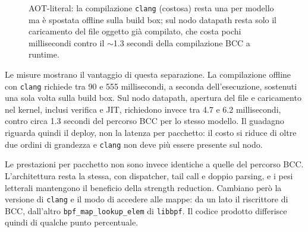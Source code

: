 \documentclass[binding=0.6cm,italian,oneside,noexaminfo]{sapthesis}
\begin{document}
\begin{figure}[h]
\centering
{}
\caption{AOT-literal: la compilazione \texttt{clang} (costosa) resta una per modello ma è spostata offline sulla build box; sul nodo datapath resta solo il caricamento del file oggetto già compilato, che costa pochi millisecondi contro il $\sim$1.3 secondi della compilazione BCC a runtime.}
\label{fig:aot}
\end{figure}

Le misure mostrano il vantaggio di questa separazione. La compilazione offline con \texttt{clang} richiede tra 90 e 555 millisecondi, a seconda dell'esecuzione, sostenuti una sola volta sulla build box. Sul nodo datapath, apertura del file e caricamento nel kernel, inclusi verifica e JIT, richiedono invece tra 4.7 e 6.2 millisecondi, contro circa 1.3 secondi del percorso BCC per lo stesso modello. Il guadagno riguarda quindi il deploy, non la latenza per pacchetto: il costo si riduce di oltre due ordini di grandezza e \texttt{clang} non deve più essere presente sul nodo.

Le prestazioni per pacchetto non sono invece identiche a quelle del percorso BCC. L'architettura resta la stessa, con dispatcher, tail call e doppio parsing, e i pesi letterali mantengono il beneficio della strength reduction. Cambiano però la versione di \texttt{clang} e il modo di accedere alle mappe: da un lato il riscrittore di BCC, dall'altro \texttt{bpf\_map\_lookup\_elem} di \texttt{libbpf}. Il codice prodotto differisce quindi di qualche punto percentuale.
\end{document}
